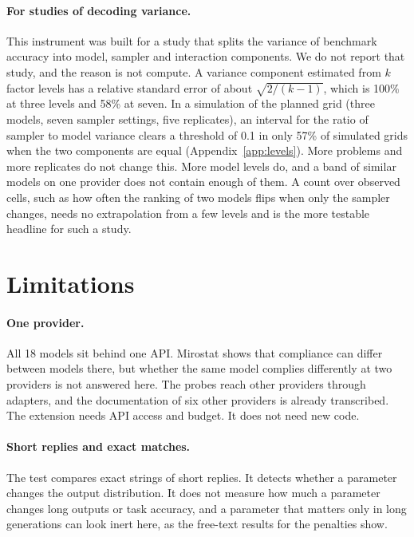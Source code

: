\documentclass[10pt]{article}
\begin{document}
\paragraph{For studies of decoding variance.} This instrument was built for a study that splits the variance of benchmark accuracy into model, sampler and interaction components. We do not report that study, and the reason is not compute. A variance component estimated from $k$ factor levels has a relative standard error of about $\sqrt{2/(k-1)}$, which is 100\% at three levels and 58\% at seven. In a simulation of the planned grid (three models, seven sampler settings, five replicates), an interval for the ratio of sampler to model variance clears a threshold of 0.1 in only 57\% of simulated grids when the two components are equal (Appendix~\ref{app:levels}). More problems and more replicates do not change this. More model levels do, and a band of similar models on one provider does not contain enough of them. A count over observed cells, such as how often the ranking of two models flips when only the sampler changes, needs no extrapolation from a few levels and is the more testable headline for such a study.

\section{Limitations}

\paragraph{One provider.} All 18 models sit behind one API. Mirostat shows that compliance can differ between models there, but whether the same model complies differently at two providers is not answered here. The probes reach other providers through adapters, and the documentation of six other providers is already transcribed. The extension needs API access and budget. It does not need new code.

\paragraph{Short replies and exact matches.} The test compares exact strings of short replies. It detects whether a parameter changes the output distribution. It does not measure how much a parameter changes long outputs or task accuracy, and a parameter that matters only in long generations can look inert here, as the free-text results for the penalties show.
\end{document}
